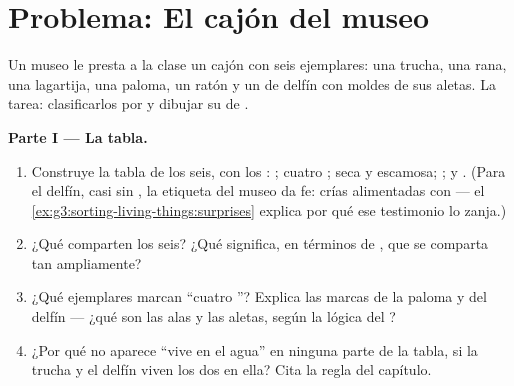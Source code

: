 \section{Problema: El cajón del museo}

\begin{problem}\label{pb:g6:classification-kinship:1}
Un museo le presta a la clase un cajón con seis ejemplares: una trucha,
una rana, una lagartija, una paloma, un ratón y un  de delfín con
moldes de sus aletas. La tarea: clasificarlos por  y dibujar
su  de .

\medskip\noindent\textbf{Parte I --- La tabla.}
\begin{enumerate}
  \item Construye la tabla de los seis, con los : ; cuatro ;  seca y escamosa; ;
         y . (Para el delfín, casi sin , la etiqueta del
        museo da fe: crías alimentadas con  --- el
        \cref{ex:g3:sorting-living-things:surprises} explica por qué
        ese testimonio lo zanja.)
  \item ¿Qué  comparten los seis? ¿Qué significa, en términos
        de , que se comparta tan ampliamente?
  \item ¿Qué ejemplares marcan ``cuatro ''? Explica las
        marcas de la paloma y del delfín --- ¿qué son las alas y las
        aletas, según la lógica del ?
  \item ¿Por qué no aparece ``vive en el agua'' en ninguna parte de la
        tabla, si la trucha y el delfín viven los dos en ella? Cita la
        regla del capítulo.
\end{enumerate}


\end{problem}
